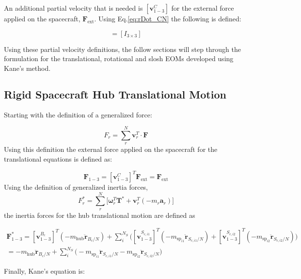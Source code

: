 \documentclass[paper]{aiaaNew}
\begin{document}
An additional partial velocity that is needed is $[\bm v^C_{1-3}]$ for the external force applied on the spacecraft, $\bm F_{\text{ext}}$. Using Eq.\eqref{eq:rDot_CN} the following is defined:

\begin{equation}
[\bm v^C_{1-3}] = [I_{3\times 3}]
\end{equation}

Using these partial velocity definitions, the follow sections will step through the formulation for the translational, rotational and slosh EOMs developed using Kane's method.

\subsection{Rigid Spacecraft Hub Translational Motion}

Starting with the definition of a generalized force:

\begin{equation}
F_r = \sum\limits_{r}^{N}  \bm v_r^T \cdot \bm F
\label{eq:genActive}
\end{equation}
Using this definition the external force applied on the spacecraft for the translational equations is defined as:

\begin{equation}
\bm F_{1-3} = [\bm v^C_{1-3}]^T \bm F_{\text{ext}} = \bm F_{\text{ext}}
\end{equation}
Using the definition of generalized inertia forces,
\begin{equation}
F^*_r = \sum\limits_{r}^{N}\Big[\bm \omega_r^T \bm T^* +  \bm v_r^T (- m_r \bm a_r)\Big]
\label{eq:genInert}
\end{equation}
the inertia forces for the hub translational motion are defined as

\begin{multline}
\bm F^*_{1-3} = [\bm v^{B_c}_{1-3}]^T (-m_{\text{hub}} \ddot{\bm r}_{B_c/N}) + \sum\limits_{i}^{N_S}\Big([\bm v^{S_{c,i1}}_{1-3}]^T (-m_{\text{sp}_{i1}} \ddot{\bm{r}}_{S_{c,{i1}}/N}) + [\bm v^{S_{c,i2}}_{1-3}]^T (-m_{\text{sp}_{i2}} \ddot{\bm{r}}_{S_{c,{i2}}/N})\Big) \\
= -m_{\text{hub}} \ddot{\bm r}_{B_c/N} + \sum\limits_{i}^{N_S} \Big( -m_{\text{sp}_{i1}} \ddot{\bm{r}}_{S_{c,{i1}}/N} -m_{\text{sp}_{i2}} \ddot{\bm{r}}_{S_{c,{i2}}/N}\Big)
\end{multline}

Finally, Kane's equation is:
\end{document}
